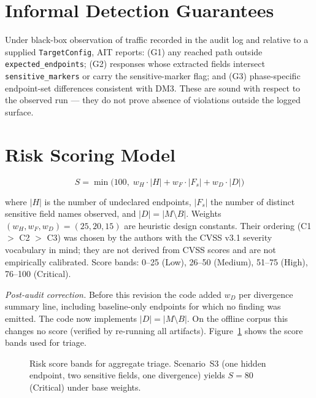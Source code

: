 \documentclass[12pt,a4paper]{report}
\begin{document}
\section{Informal Detection Guarantees}

Under black-box observation of traffic recorded in the audit log and relative to a supplied
\texttt{TargetConfig}, AIT reports: (G1) any reached path outside \texttt{expected\_endpoints};
(G2) responses whose extracted fields intersect \texttt{sensitive\_markers} or carry the
sensitive-marker flag; and (G3) phase-specific endpoint-set differences consistent with DM3.
These are sound with respect to the observed run --- they do not prove absence
of violations outside the logged surface.

\section{Risk Scoring Model}

\[
    S = \min\!\bigl(100,\; w_H \cdot |H| + w_F \cdot |F_s| + w_D \cdot |D|\bigr)
\]

where $|H|$ is the number of undeclared endpoints, $|F_s|$ the number of distinct sensitive field
names observed, and $|D| = |M \setminus B|$. Weights $(w_H, w_F, w_D) = (25, 20, 15)$ are heuristic
design constants. Their ordering (C1 $>$ C2 $>$ C3) was chosen by the authors with the CVSS v3.1
severity vocabulary \cite{cvss31} in mind; they are not derived from CVSS scores and are not
empirically calibrated. Score bands: 0--25 (Low), 26--50 (Medium), 51--75 (High), 76--100
(Critical).

\textit{Post-audit correction.} Before this revision the code added $w_D$ per divergence summary
line, including baseline-only endpoints for which no finding was emitted. The code now implements
$|D| = |M \setminus B|$. On the offline corpus this changes no score (verified by re-running all
artifacts).
Figure~\ref{fig:risk-bands} shows the score bands used for triage.

\begin{figure}[H]
    \centering
    \caption{Risk score bands for aggregate triage. Scenario~S3 (one hidden endpoint, two
             sensitive fields, one divergence) yields $S=80$ (Critical) under base weights.}
    \label{fig:risk-bands}
\end{figure}
\end{document}
